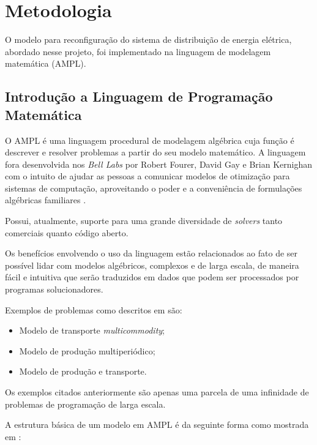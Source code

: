 \section{Metodologia}

O modelo para reconfiguração do sistema de distribuição de energia elétrica, abordado nesse projeto, foi implementado na linguagem de modelagem matemática (AMPL).

\subsection{Introdução a Linguagem de Programação Matemática}

O AMPL é uma linguagem procedural de modelagem algébrica cuja função é descrever e resolver problemas a partir do seu modelo matemático. 
A linguagem fora desenvolvida nos \emph{Bell Labs} por Robert Fourer, David Gay e Brian Kernighan com o intuito de ajudar as pessoas a comunicar modelos de otimização para sistemas de computação, aproveitando o poder e a conveniência de formulações algébricas familiares \cite{ampl}. 

Possui, atualmente, suporte para uma grande diversidade de \textit{solvers} tanto comerciais quanto código aberto.

Os benefícios envolvendo o uso da linguagem estão relacionados ao fato de ser possível lidar com modelos algébricos, complexos e de larga escala, de maneira fácil e intuitiva que serão traduzidos em dados que podem ser processados por programas solucionadores.

Exemplos de problemas como descritos em \cite{Fourer2003AMPLProgramming} são:

\begin{itemize}
    \item Modelo de transporte \textit{multicommodity};
    
    \item Modelo de produção multiperiódico;
    
    \item Modelo de produção e transporte.
\end{itemize}

Os exemplos citados anteriormente são apenas uma parcela de uma infinidade de problemas de programação de larga escala.


A estrutura básica de um modelo em AMPL é da seguinte forma como mostrada em \cite{taha2008pesquisa}:

